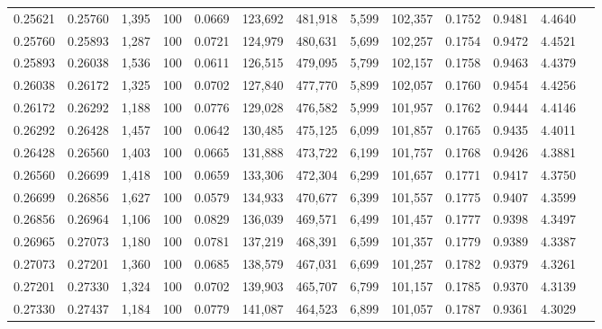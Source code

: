 \begin{tabular}{rrrrrrrrrrrrr}
0.25621 & 0.25760 & 1,395 & 100 &                                     0.0669 & 123,692 & 481,918 &   5,599 & 102,357 & 0.1752 & 0.9481 & 4.4640 \\
0.25760 & 0.25893 & 1,287 & 100 &                                     0.0721 & 124,979 & 480,631 &   5,699 & 102,257 & 0.1754 & 0.9472 & 4.4521 \\
0.25893 & 0.26038 & 1,536 & 100 &                                     0.0611 & 126,515 & 479,095 &   5,799 & 102,157 & 0.1758 & 0.9463 & 4.4379 \\
0.26038 & 0.26172 & 1,325 & 100 &                                     0.0702 & 127,840 & 477,770 &   5,899 & 102,057 & 0.1760 & 0.9454 & 4.4256 \\
0.26172 & 0.26292 & 1,188 & 100 &                                     0.0776 & 129,028 & 476,582 &   5,999 & 101,957 & 0.1762 & 0.9444 & 4.4146 \\
0.26292 & 0.26428 & 1,457 & 100 &                                     0.0642 & 130,485 & 475,125 &   6,099 & 101,857 & 0.1765 & 0.9435 & 4.4011 \\
0.26428 & 0.26560 & 1,403 & 100 &                                     0.0665 & 131,888 & 473,722 &   6,199 & 101,757 & 0.1768 & 0.9426 & 4.3881 \\
0.26560 & 0.26699 & 1,418 & 100 &                                     0.0659 & 133,306 & 472,304 &   6,299 & 101,657 & 0.1771 & 0.9417 & 4.3750 \\
0.26699 & 0.26856 & 1,627 & 100 &                                     0.0579 & 134,933 & 470,677 &   6,399 & 101,557 & 0.1775 & 0.9407 & 4.3599 \\
0.26856 & 0.26964 & 1,106 & 100 &                                     0.0829 & 136,039 & 469,571 &   6,499 & 101,457 & 0.1777 & 0.9398 & 4.3497 \\
0.26965 & 0.27073 & 1,180 & 100 &                                     0.0781 & 137,219 & 468,391 &   6,599 & 101,357 & 0.1779 & 0.9389 & 4.3387 \\
0.27073 & 0.27201 & 1,360 & 100 &                                     0.0685 & 138,579 & 467,031 &   6,699 & 101,257 & 0.1782 & 0.9379 & 4.3261 \\
0.27201 & 0.27330 & 1,324 & 100 &                                     0.0702 & 139,903 & 465,707 &   6,799 & 101,157 & 0.1785 & 0.9370 & 4.3139 \\
0.27330 & 0.27437 & 1,184 & 100 &                                     0.0779 & 141,087 & 464,523 &   6,899 & 101,057 & 0.1787 & 0.9361 & 4.3029 \\

\end{tabular}
